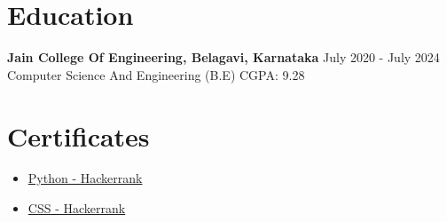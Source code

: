 \documentclass[a4paper,10pt]{article}
\begin{document}
\section*{Education}
\noindent
\textbf{Jain College Of Engineering, Belagavi, Karnataka} \hfill July 2020 - July 2024 \\
Computer Science And Engineering (B.E) \hfill CGPA: 9.28

\section*{Certificates}
\begin{itemize}[label=--,left=0pt]
  \item \href{https://www.hackerrank.com/certificates/4549bfcbe000}{Python - Hackerrank}
  \item \href{https://www.hackerrank.com/certificates/c045fb9d30e6}{CSS - Hackerrank}
\end{itemize}
\end{document}
